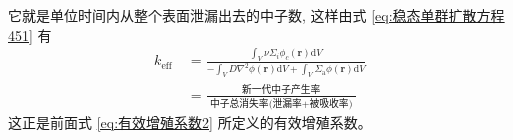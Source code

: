 \documentclass{Sichuan Normal University}
\begin{document}
它就是单位时间内从整个表面泄漏出去的中子数, 这样由式 \eqref{eq:稳态单群扩散方程451} 有
\begin{equation}
\begin{aligned}
k_{\text {eff }} & =\frac{\int_V \nu \Sigma_i \phi_c(\boldsymbol{r}) \mathrm{d} V}{-\int_V D \nabla^2 \phi(\boldsymbol{r}) \mathrm{d} V+\int_V \Sigma_{\mathrm{a}} \phi(\boldsymbol{r}) \mathrm{d} V} \\
& =\frac{\text { 新一代中子产生率 }}{\text { 中子总消失率(泄漏率+被吸收率) }}
\end{aligned}
\end{equation}
这正是前面式 \eqref{eq:有效增殖系数2} 所定义的有效增殖系数。








    
\end{document}
